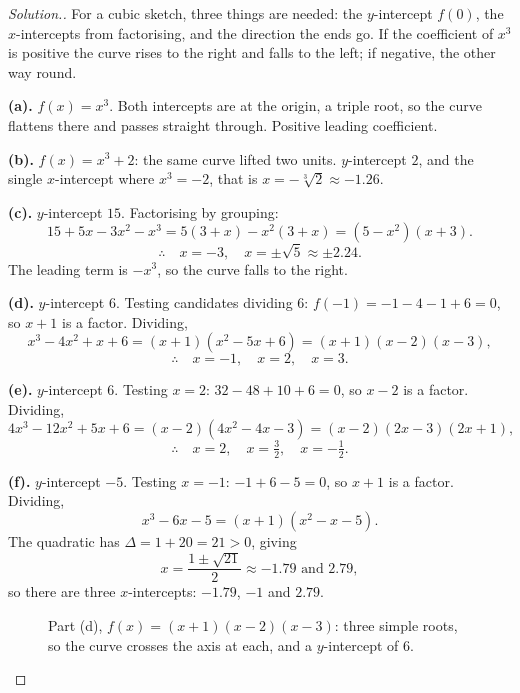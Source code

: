 \documentclass[11pt,a4paper]{article}
\theoremstyle{definition}
\newenvironment{solution}
  {\renewcommand{\qedsymbol}{}\begin{proof}[\textit{Solution}.]}
  {\end{proof}}
\begin{document}
\begin{solution}
For a cubic sketch, three things are needed: the $y$-intercept $f(0)$, the
$x$-intercepts from factorising, and the direction the ends go. If the coefficient of
$x^3$ is positive the curve rises to the right and falls to the left; if negative, the
other way round.

\textbf{(a).} $f(x)=x^3$. Both intercepts are at the origin, a triple root, so the curve
flattens there and passes straight through. Positive leading coefficient.

\textbf{(b).} $f(x)=x^3+2$: the same curve lifted two units. $y$-intercept $2$, and the
single $x$-intercept where $x^3=-2$, that is $x=-\sqrt[3]{2}\approx-1.26$.

\textbf{(c).} $y$-intercept $15$. Factorising by grouping:
$$15+5x-3x^2-x^3=5(3+x)-x^2(3+x)=\left(5-x^2\right)(x+3).$$
$$\therefore\quad x=-3,\quad x=\pm\sqrt{5}\approx\pm 2.24.$$
The leading term is $-x^3$, so the curve falls to the right.

\textbf{(d).} $y$-intercept $6$. Testing candidates dividing $6$: $f(-1)=-1-4-1+6=0$,
so $x+1$ is a factor. Dividing,
$$x^3-4x^2+x+6=(x+1)\left(x^2-5x+6\right)=(x+1)(x-2)(x-3),$$
$$\therefore\quad x=-1,\quad x=2,\quad x=3.$$

\textbf{(e).} $y$-intercept $6$. Testing $x=2$: $32-48+10+6=0$, so $x-2$ is a factor.
Dividing,
$$4x^3-12x^2+5x+6=(x-2)\left(4x^2-4x-3\right)=(x-2)(2x-3)(2x+1),$$
$$\therefore\quad x=2,\quad x=\tfrac{3}{2},\quad x=-\tfrac{1}{2}.$$

\textbf{(f).} $y$-intercept $-5$. Testing $x=-1$: $-1+6-5=0$, so $x+1$ is a factor.
Dividing,
$$x^3-6x-5=(x+1)\left(x^2-x-5\right).$$
The quadratic has $\Delta=1+20=21>0$, giving
$$x=\frac{1\pm\sqrt{21}}{2}\approx -1.79 \text{ and } 2.79,$$
so there are three $x$-intercepts: $-1.79$, $-1$ and $2.79$.

\begin{figure}[H]
\centering
{}
\caption{Part (d), $f(x)=(x+1)(x-2)(x-3)$: three simple roots, so the curve crosses the axis at each, and a $y$-intercept of 6.}
\end{figure}


\end{solution}
\end{document}
